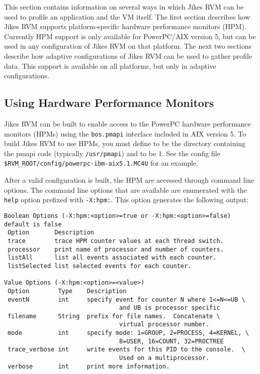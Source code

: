This section contains information on several ways in which
Jikes\TMweb{} RVM can be used to profile an application and the VM
itself.  The first section describes how Jikes RVM supports
platform-specific hardware performance monitors (HPM). Currently HPM
support is only available for
PowerPC\TMweb/AIX\TMweb{} version 5, but can be
used in any configuration of Jikes RVM on that platform.  The next two
sections describe how adaptive configurations of Jikes RVM can be used
to gather profile data.  This support is available on all platforms,
but only in adaptive configurations.

\subsection{Using Hardware Performance Monitors}

Jikes RVM can be built to enable access to the PowerPC hardware
performance monitors (HPMs) using the {\tt bos.pmapi} interface 
included in AIX version 5. To build Jikes RVM to use
HPMs, you must define  to be the directory containing
the pmapi code (typically {\tt /usr/pmapi}) and  to be 1.
See the config file {\tt \$RVM\_\-ROOT/config/powerpc-ibm-aix5.1.MC4U} for
an example.

After a valid configuration is built, the HPM are accessed through 
command line options. 
The command line options that are available are enumerated with the 
{\tt help} option prefixed with {\tt -X:hpm:}.  This option
generates the following output:
%
\begin{verbatim}
Boolean Options (-X:hpm:<option>=true or -X:hpm:<option>=false) default is false
 Option       Description
 trace        trace HPM counter values at each thread switch.
 processor    print name of processor and number of counters.
 listAll      list all events associated with each counter.
 listSelected list selected events for each counter.

Value Options (-X:hpm:<option>=<value>)
 Option        Type    Description
 eventN        int     specify event for counter N where 1<=N<=UB \
                                and UB is processor specific
 filename      String  prefix for file names.  Concatenate \
                                virtual processor number.
 mode          int     specify mode: 1=GROUP, 2=PROCESS, 4=KERNEL, \
                                8=USER, 16=COUNT, 32=PROCTREE
 trace_verbose int     write events for this PID to the console.  \
                                Used on a multiprocessor.
 verbose       int     print more information.
\end{verbatim}

